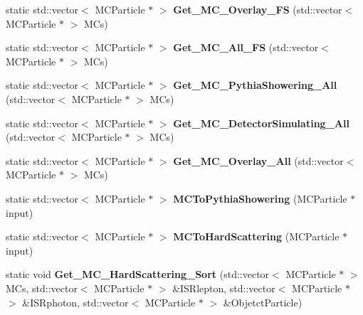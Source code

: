 \begin{DoxyCompactItemize}
\item 
\hypertarget{classToolSet_1_1CMC_a0174dfbf7511f9fa827d9fff33aabc8b}{
static std::vector$<$ MCParticle $\ast$ $>$ {\bfseries Get\_\-MC\_\-Overlay\_\-FS} (std::vector$<$ MCParticle $\ast$ $>$ MCs)}
\label{classToolSet_1_1CMC_a0174dfbf7511f9fa827d9fff33aabc8b}

\item 
\hypertarget{classToolSet_1_1CMC_a826b4fcc4ae58b18ceec544fb5abf563}{
static std::vector$<$ MCParticle $\ast$ $>$ {\bfseries Get\_\-MC\_\-All\_\-FS} (std::vector$<$ MCParticle $\ast$ $>$ MCs)}
\label{classToolSet_1_1CMC_a826b4fcc4ae58b18ceec544fb5abf563}

\item 
\hypertarget{classToolSet_1_1CMC_a96c8f9998df8b19c84b0f45271195ef9}{
static std::vector$<$ MCParticle $\ast$ $>$ {\bfseries Get\_\-MC\_\-PythiaShowering\_\-All} (std::vector$<$ MCParticle $\ast$ $>$ MCs)}
\label{classToolSet_1_1CMC_a96c8f9998df8b19c84b0f45271195ef9}

\item 
\hypertarget{classToolSet_1_1CMC_a8581240b2a8d474e851c3c1ed256fada}{
static std::vector$<$ MCParticle $\ast$ $>$ {\bfseries Get\_\-MC\_\-DetectorSimulating\_\-All} (std::vector$<$ MCParticle $\ast$ $>$ MCs)}
\label{classToolSet_1_1CMC_a8581240b2a8d474e851c3c1ed256fada}

\item 
\hypertarget{classToolSet_1_1CMC_a4bf55a4d64eeec4762f87ee7de91f585}{
static std::vector$<$ MCParticle $\ast$ $>$ {\bfseries Get\_\-MC\_\-Overlay\_\-All} (std::vector$<$ MCParticle $\ast$ $>$ MCs)}
\label{classToolSet_1_1CMC_a4bf55a4d64eeec4762f87ee7de91f585}

\item 
\hypertarget{classToolSet_1_1CMC_a38ef7e0f75f14714d4636ca70c1b717c}{
static std::vector$<$ MCParticle $\ast$ $>$ {\bfseries MCToPythiaShowering} (MCParticle $\ast$input)}
\label{classToolSet_1_1CMC_a38ef7e0f75f14714d4636ca70c1b717c}

\item 
\hypertarget{classToolSet_1_1CMC_adfd54e8274a8994f4cc0a531a028cd01}{
static std::vector$<$ MCParticle $\ast$ $>$ {\bfseries MCToHardScattering} (MCParticle $\ast$input)}
\label{classToolSet_1_1CMC_adfd54e8274a8994f4cc0a531a028cd01}

\item 
\hypertarget{classToolSet_1_1CMC_abf41aa5efde937a3e21fa3b24323d570}{
static void {\bfseries Get\_\-MC\_\-HardScattering\_\-Sort} (std::vector$<$ MCParticle $\ast$ $>$ MCs, std::vector$<$ MCParticle $\ast$ $>$ \&ISRlepton, std::vector$<$ MCParticle $\ast$ $>$ \&ISRphoton, std::vector$<$ MCParticle $\ast$ $>$ \&ObjetctParticle)}
\label{classToolSet_1_1CMC_abf41aa5efde937a3e21fa3b24323d570}


\end{DoxyCompactItemize}
